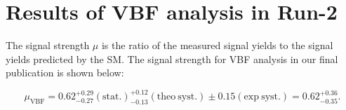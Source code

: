 \section{Results of VBF analysis in Run-2}\label{VBF:Results}
The signal strength $\mu$ is the ratio of the measured signal yields to the signal yields predicted by the SM. The signal strength for VBF analysis in our final publication \cite{HWWRun2Paper} is shown below:

\begin{equation}
\mu_{\mathrm{VBF}} =  0.62^{+0.29}_{-0.27} (\mathrm{stat.})^{+0.12}_{-0.13} (\mathrm{theo~ syst.})\pm 0.15(\mathrm{exp~ syst.}) = 0.62^{+0.36}_{-0.35}.
\end{equation}\label{eqn:SignalStrength}

